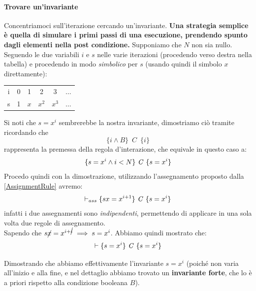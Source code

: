 \begin{esempio}
				      			\paragraph{Trovare un'invariante}
				      			Concentriamoci sull'iterazione cercando un'invariante. \textbf{Una strategia
				      			semplice è quella di simulare i primi passi di una esecuzione, prendendo spunto dagli elementi nella post condizione.} Supponiamo che $N$ non sia nullo. Seguendo le due variabili $i$ e $s$ nelle varie
				      			iterazioni (procedendo verso destra nella tabella) e procedendo in modo
				      			\textit{simbolico} per $s$ (usando quindi il simbolo $x$ direttamente):
				      			\begin{table}[H]
				      				\centering
				      				\begin{tabular}[H]{c|ccccc}
				      					i & 0 & 1   & 2     & 3     & $\ldots$ \\
				      					s & 1 & $x$ & $x^2$ & $x^3$ & $\ldots$ 
				      				\end{tabular}
				      			\end{table}
				      			Si noti che $s= x^i$ sembrerebbe la nostra invariante, dimostriamo ciò tramite ricordando che 
				      			\[\{i\land B\}\,\,\, C\,\,\,\{i\}\] rappresenta la premessa della regola d'interazione, che equivale in questo caso a:
				      			\[\{s=x^i\land i<N\}\mbox{ \textit{C} }\{s=x^i\}\]
				      			Procedo quindi con la dimostrazione, utilizzando l'assegnamento proposto dalla \ref{AssignmentRule} avremo:
				      			\[\vdash_{ass}\{sx=x^{i+1}\}\mbox{ \textit{C} }\{s=x^i\}\]
				      			infatti i due assegnamenti sono \emph{indipendenti}, permettendo di applicare
				      			in una sola volta due regole di assegnamento.\\
				      			Sapendo che $s\cancel{x}=x^{i+\cancel{i}}\implies s=x^i$. Abbiamo quindi mostrato
				      			che:
				      			\[\vdash \{s=x^i\}\mbox{ \textit{C} }\{s=x^i\}\]
				      	
				      			Dimostrando che abbiamo effettivamente l'invariante $s= x^i$ (poiché non varia all'inizio e alla fine, e nel dettaglio
				      			abbiamo trovato un \textbf{invariante forte}, che lo è a priori rispetto alla
				      			condizione booleana $B$).\\
				      							      			  

\end{esempio}
